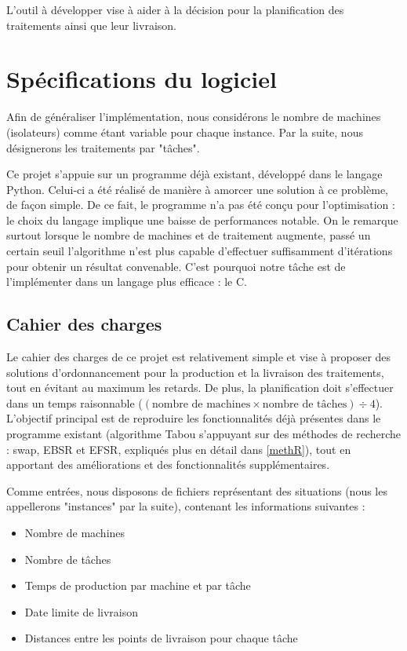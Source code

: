 \documentclass[hideweeklyreports]{polytech/polytech}
\begin{document}
		L'outil à développer vise à aider à la décision pour la planification des traitements ainsi que leur livraison.
		
	\chapter{Spécifications du logiciel}
		Afin de généraliser l'implémentation, nous considérons le nombre de machines (isolateurs) comme étant variable pour chaque instance. Par la suite, nous désignerons les traitements par "tâches".
		
		Ce projet s'appuie sur un programme déjà existant, développé dans le langage Python. Celui-ci a été réalisé de manière à amorcer une solution à ce problème, de façon simple. De ce fait, le programme n'a pas été conçu pour l'optimisation : le choix du langage implique une baisse de performances notable. On le remarque surtout lorsque le nombre de machines et de traitement augmente, passé un certain seuil l'algorithme n'est plus capable d'effectuer suffisamment d'itérations pour obtenir un résultat convenable. C'est pourquoi notre tâche est de l'implémenter dans un langage plus efficace : le C.
		\section{Cahier des charges}
			Le cahier des charges de ce projet est relativement simple et vise à proposer des solutions d'ordonnancement pour la production et la livraison des traitements, tout en évitant au maximum les retards. De plus, la planification doit s'effectuer dans un temps raisonnable ($(\text{nombre de machines}\times \text{nombre de tâches})\div 4$). L'objectif principal est de reproduire les fonctionnalités déjà présentes dans le programme existant (algorithme Tabou s'appuyant sur des méthodes de recherche : swap, EBSR et EFSR, expliqués plus en détail dans \autoref{methR}), tout en apportant des améliorations et des fonctionnalités supplémentaires.
			
			Comme entrées, nous disposons de fichiers représentant des situations (nous les appellerons "instances" par la suite), contenant les informations suivantes :
			\begin{itemize}
				\item Nombre de machines
				\item Nombre de tâches
				\item Temps de production par machine et par tâche
				\item Date limite de livraison
				\item Distances entre les points de livraison pour chaque tâche
			\end{itemize}
			
\end{document}
